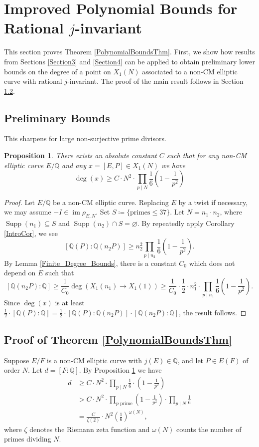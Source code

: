 \documentclass{amsart}
\newtheorem{proposition}{Proposition}
\theoremstyle{definition}
\newcommand{\Q}{\mathbb{Q}}
\newcommand{\Supp}{\operatorname{Supp}}
\DeclareMathOperator{\im}{im}
\begin{document}
\section{Improved Polynomial Bounds for Rational $j$-invariant}
This section proves Theorem \ref{PolynomialBoundsThm}.
First, we show how results from Sections \ref{Section3} and \ref{Section4} can be applied to obtain preliminary lower bounds on the degree of a point on $X_1(N)$ associated to a non-CM elliptic curve with rational $j$-invariant. The proof of the main result follows in Section \ref{Section5.2}.

\subsection{Preliminary Bounds} This sharpens  \cite[Proposition 5]{BourdonGenao} for large non-surjective prime divisors.
\begin{proposition}\label{LowerBoundProp}
   There exists an absolute constant $C$ such that for any non-CM elliptic curve $E/\Q$ and any $x=[E,P]\in X_1(N)$ we have
    \[
    \deg(x) \geq C \cdot N^2\cdot \prod_{p \mid N}\frac{1}{6}\left(1-\frac{1}{p^2}\right) \]
\end{proposition}

\begin{proof}
   Let $E/\Q$ be a non-CM elliptic curve. Replacing $E$ by a twist if necessary, we may assume $-I \in \im \rho_{E,N}$. Set $S \coloneqq \{\text{primes} \leq 37\}$. Let $N=n_1\cdot n_2$, where $\Supp(n_1) \subseteq S$ and $\Supp(n_2) \cap S=\varnothing$. By repeatedly apply Corollary \ref{IntroCor}, we see 
        \[
        [\Q(P):\Q(n_2P)]\geq n_2^2\prod_{p \mid n_2}\frac{1}{6}\left(1-\frac{1}{p^2}\right).     \]
        By Lemma \ref{Finite_Degree_Bounds}, there is a constant $C_0$ which does not depend on $E$ such that
 \[
        [\Q(n_2P):\Q] \geq \frac{1}{C_0} \deg(X_1(n_1) \rightarrow X_1(1)) \geq \frac{1}{C_0} \cdot\frac{1}{2} \cdot n_1^2\cdot \prod_{p \mid n_1}\frac{1}{6}\left(1-\frac{1}{p^2}\right).
        \]
        Since $\deg(x)$ is at least $\frac{1}{2}\cdot [\Q(P):\Q] =\frac{1}{2}\cdot[\Q(P):\Q(n_2P)]\cdot[\Q(n_2P):\Q]$, the result follows. \qedhere
  
\end{proof}
\subsection{Proof of Theorem \ref{PolynomialBoundsThm}}\label{Section5.2}
Suppose $E/F$ is a non-CM elliptic curve with $j(E) \in \Q$, and let $P \in E(F)$ of order $N$.
    Let $d=[F:\Q]$. By Proposition \ref{LowerBoundProp} we have
    \begin{align*}
    d &\geq C\cdot N^2 \cdot  \prod_{p \mid N}\frac{1}{6} \cdot \left(1-\frac{1}{p^2}\right)\\
    & > C\cdot N^2 \cdot  \prod_{p \text{ prime}}\left(1-\frac{1}{p^2}\right)\cdot \prod_{p \mid N}\frac{1}{6}\\
    &=\frac{C}{\zeta(2)}\cdot N^2 \left(\frac{1}{6}\right)^{\omega(N)},
    \end{align*}
    where $\zeta$ denotes the Riemann zeta function and $\omega(N)$ counts the number of primes dividing $N$. 
\end{document}
